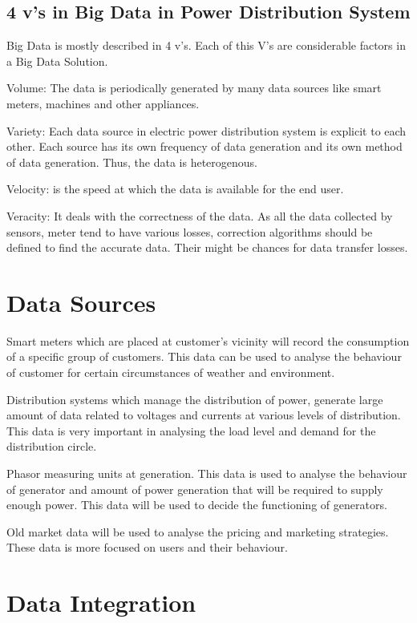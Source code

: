 \documentclass[sigconf]{acmart}
\begin{document}
\subsection{4 v's in Big Data in Power Distribution System}

Big Data is mostly described in 4 v's. Each of this V's are considerable factors in a Big Data Solution.\cite{A.Munshi2017}

Volume: The data is periodically generated by many data sources like smart meters, machines and other appliances.

Variety: Each data source in electric power distribution system is explicit to each other. Each source has its own frequency of data generation and its own method of data generation. Thus, the data is heterogenous.

Velocity: is the speed at which the data is available for the end user.

Veracity: It deals with the correctness of the data. As all the data collected by sensors, meter tend to have various losses, correction algorithms should be defined to find the accurate data. Their might be chances for data transfer losses.

\section{Data Sources}

Smart meters which are placed at customer's vicinity will record the consumption of a specific group of customers. This data can be used to analyse the behaviour of customer for certain circumstances of weather and environment.

Distribution systems which manage the distribution of power, generate large amount of data related to voltages and currents at various levels of distribution. This data is very important in analysing the load level and demand for the distribution circle.\cite{Ali2013}

 Phasor measuring units at generation. This data is used to analyse the behaviour of generator and amount of power generation that will be required to supply enough power. This data will be used to decide the functioning of generators.\cite{ShadyS.Refaat2016}
 
Old market data will be used to analyse the pricing and marketing strategies. These data is more focused on users and their behaviour.

\section{Data Integration}
\end{document}
